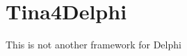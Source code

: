 \chapter{Tina4\+Delphi}
\hypertarget{md_readme}{}\label{md_readme}
\label{md_readme_autotoc_md0}%
%
 This is not another framework for Delphi 